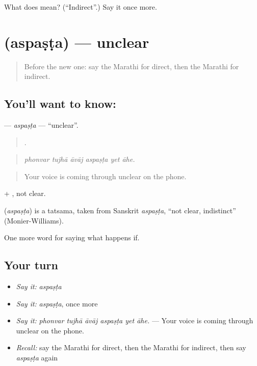 \begin{tcolorbox}[breakable,colback=teal!4,colframe=teal!35!black,title={Before you move on}]
What does  mean? (\textquotedblleft{}Indirect\textquotedblright{}.) Say it once more.
\end{tcolorbox}
\section[\texorpdfstring{\mr{अस्पष्ट} (aspaṣṭa)}{अस्पष्ट (aspaṣṭa)}]{ (aspaṣṭa) — unclear}

\label{lesson:MR-C395-aspasta}



\begin{quote}
Before the new one: say the Marathi for direct, then the Marathi for indirect.
\end{quote}

\subsection*{You'll want to know: }
\textbf{} — \emph{aspaṣṭa} — \textquotedblleft{}unclear\textquotedblright{}.

\begin{quote}
     .
\end{quote}

\begin{quote}
\emph{phonvar tujhā āvāj aspaṣṭa yet āhe.}
\end{quote}

\begin{quote}
Your voice is coming through unclear on the phone.
\end{quote}

 + , not clear.

\begin{cousinweb}
\textbf{} (\emph{aspaṣṭa}) is a tatsama, taken from Sanskrit \emph{aspaṣṭa}, \textquotedblleft{}not clear, indistinct\textquotedblright{} (Monier-Williams).
\end{cousinweb}

\begin{grammarlens}[title={What you've built}]
One more word for saying what happens if.
\end{grammarlens}

\subsection*{Your turn}
\begin{itemize}
\raggedright
  \item \emph{Say it:} \emph{aspaṣṭa}
  \item \emph{Say it:} \emph{aspaṣṭa}, once more
  \item \emph{Say it:} \emph{phonvar tujhā āvāj aspaṣṭa yet āhe.} — Your voice is coming through unclear on the phone.
  \item \emph{Recall:} say the Marathi for direct, then the Marathi for indirect, then say \emph{aspaṣṭa} again
\end{itemize}

